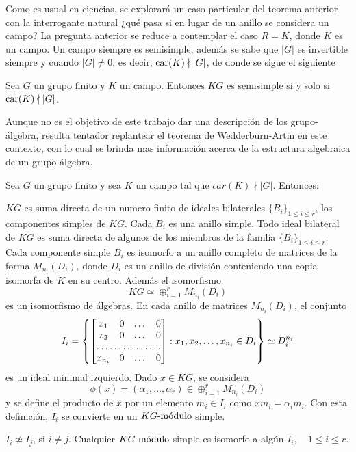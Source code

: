 Como es usual en ciencias, se explorará un caso particular del teorema anterior con la interrogante natural ¿qué pasa si en lugar de un anillo se considera un campo? La pregunta anterior se reduce a contemplar el caso $R = K$, donde $K$ es un campo. Un campo siempre es semisimple, además se sabe que $|G|$ es invertible siempre y cuando $|G| \neq 0$, es decir, $\car(K) \nmid |G|$, de donde se sigue el siguiente
\begin{corolario}\label{cor:car}
Sea $G$ un grupo finito y $K$ un campo. Entonces $KG$ es semisimple si y solo si $\car(K) \nmid |G|$.
\end{corolario}


Aunque no es el objetivo de este trabajo dar una descripción de los grupo-álgebra, resulta tentador replantear el teorema de Wedderburn-Artin en este contexto, con lo cual se brinda mas información acerca de la estructura algebraica de un grupo-álgebra.
\begin{teorema}\label{teo:wa}
Sea $G$ un grupo finito y sea $K$ un campo tal que $car(K) \nmid |G|$. Entonces:
\begin{bulletList}
\newItem $KG$ es suma directa de un numero finito de ideales bilaterales $\{B_i\}_{ 1 \leq i \leq r}$, los componentes simples de $KG$. Cada $B_i$ es una anillo simple.
\newItem Todo ideal bilateral de $KG$ es suma directa de algunos de los miembros de la familia $\{B_i\}_{ 1 \leq i \leq r}$.
\newItem Cada componente simple $B_i$ es isomorfo a un anillo completo de matrices de la forma $M_{n_i}(D_i)$, donde $D_i$ es un anillo de división conteniendo una copia isomorfa de $K$ en su centro. Además el isomorfismo
\[KG \simeq \oplus_{i=1}^{r} M_{n_i}(D_i) \]
es un isomorfismo de álgebras. 
\newItem En cada anillo de matrices $M_{n_i}(D_i)$, el conjunto
\[ I_i =  \left\{ \begin{bmatrix}
x_1 & 0 & \dots & 0 \\
x_2 & 0 & \dots & 0 \\
\hdotsfor{4} \\
x_{n_i} & 0 & \dots & 0 \\
\end{bmatrix} : x_1, x_2, \dots, x_{n_i} \in D_i \right\} \simeq D_i^{n_i} \] 
es un ideal minimal izquierdo. 
Dado $x \in KG$, se considera \[\phi (x) = (\alpha_1, \dots, \alpha_r) \in \oplus_{i=1}^r M_{n_i}(D_i)\] y se define el producto de $x$ por un elemento $m_i \in I_i$ como $xm_i = \alpha_im_i$. Con esta definición, $I_i$ se convierte en un $\modulo{KG}$ simple.

\newItem $I_i \not \simeq I_j$, si $ i \neq j$.
\newItem Cualquier $\modulo{KG}$  simple es isomorfo a algún $I_i, \quad 1 \leq i \leq r$. 
\end{bulletList}
\end{teorema}

